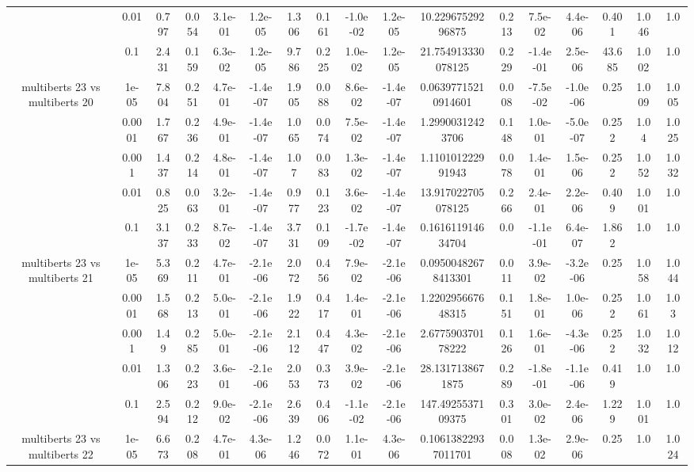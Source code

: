 \begin{tabular}{|c|c|c|c|c|c|c|c|c|c|c|c|c|c|c|c|c|}
 & 0.01 & 0.797 & 0.054 & 3.1e-01 & 1.2e-05 & 1.306 & 0.161 & -1.0e-02 & 1.2e-05 & 10.22967529296875 & 0.213 & 7.5e-02 & 4.4e-06 & 0.401 & 1.046 & 1.0 \\
 & 0.1 & 2.431 & 0.159 & 6.3e-02 & 1.2e-05 & 9.786 & 0.225 & 1.0e-02 & 1.2e-05 & 21.754913330078125 & 0.229 & -1.4e-01 & 2.5e-06 & 43.685 & 1.002 & 1.0 \\
\hline
\multirow{5}{*}{multiberts 23 vs multiberts 20} & 1e-05 & 7.804 & 0.251 & 4.7e-01 & -1.4e-07 & 1.905 & 0.088 & 8.6e-02 & -1.4e-07 & 0.06397715210914601 & 0.008 & -7.5e-02 & -1.0e-06 & 0.25 & 1.009 & 1.005 \\
 & 0.0001 & 1.767 & 0.236 & 4.9e-01 & -1.4e-07 & 1.065 & 0.074 & 7.5e-02 & -1.4e-07 & 1.29900312423706 & 0.148 & 1.0e-01 & -5.0e-07 & 0.252 & 1.04 & 1.025 \\
 & 0.001 & 1.437 & 0.214 & 4.8e-01 & -1.4e-07 & 1.07 & 0.083 & 1.3e-02 & -1.4e-07 & 1.110101222991943 & 0.078 & 1.4e-01 & 1.5e-06 & 0.252 & 1.052 & 1.032 \\
 & 0.01 & 0.825 & 0.063 & 3.2e-01 & -1.4e-07 & 0.977 & 0.123 & 3.6e-02 & -1.4e-07 & 13.917022705078125 & 0.266 & 2.4e-01 & 2.2e-06 & 0.409 & 1.001 & 1.0 \\
 & 0.1 & 3.137 & 0.233 & 8.7e-02 & -1.4e-07 & 3.731 & 0.109 & -1.7e-02 & -1.4e-07 & 0.161611914634704 & 0.0 & -1.1e-01 & 6.4e-07 & 1.862 & 1.0 & 1.0 \\
\hline
\multirow{5}{*}{multiberts 23 vs multiberts 21} & 1e-05 & 5.369 & 0.211 & 4.7e-01 & -2.1e-06 & 2.072 & 0.456 & 7.9e-02 & -2.1e-06 & 0.09500482678413301 & 0.011 & 3.9e-02 & -3.2e-06 & 0.25 & 1.058 & 1.044 \\
 & 0.0001 & 1.568 & 0.213 & 5.0e-01 & -2.1e-06 & 1.922 & 0.417 & 1.4e-01 & -2.1e-06 & 1.220295667648315 & 0.151 & 1.8e-01 & 1.0e-06 & 0.252 & 1.061 & 1.03 \\
 & 0.001 & 1.49 & 0.285 & 5.0e-01 & -2.1e-06 & 2.112 & 0.447 & 4.3e-02 & -2.1e-06 & 2.677590370178222 & 0.126 & 1.6e-01 & -4.3e-06 & 0.252 & 1.032 & 1.012 \\
 & 0.01 & 1.306 & 0.223 & 3.6e-01 & -2.1e-06 & 2.053 & 0.373 & 3.9e-02 & -2.1e-06 & 28.1317138671875 & 0.289 & -1.8e-01 & -1.1e-06 & 0.419 & 1.0 & 1.0 \\
 & 0.1 & 2.594 & 0.212 & 9.0e-02 & -2.1e-06 & 2.639 & 0.406 & -1.1e-02 & -2.1e-06 & 147.4925537109375 & 0.301 & 3.0e-02 & 2.4e-06 & 1.229 & 1.001 & 1.0 \\
\hline
\multirow{5}{*}{multiberts 23 vs multiberts 22} & 1e-05 & 6.673 & 0.208 & 4.7e-01 & 4.3e-06 & 1.246 & 0.072 & 1.1e-01 & 4.3e-06 & 0.10613822937011701 & 0.008 & 1.3e-02 & 2.9e-06 & 0.25 & 1.0 & 1.024 \\

\end{tabular}
